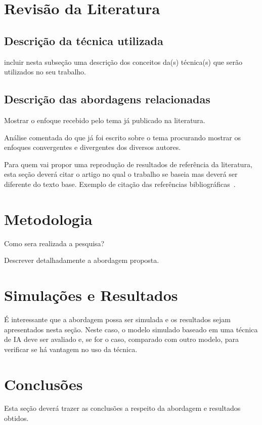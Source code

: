 \documentclass[english]{article}
\begin{document}
\section{Revisão da Literatura}
\subsection{Descrição da técnica utilizada}
incluir nesta subseção uma descrição dos conceitos da(s) técnica(s)
que serão utilizados no seu trabalho.

\subsection{Descrição das abordagens relacionadas}
\vspace{1cm} Mostrar o enfoque recebido pelo tema já publicado na
literatura. \vspace{1cm}

Análise comentada do que já foi escrito sobre o tema procurando
mostrar os enfoques convergentes e divergentes dos diversos
autores. \vspace{1cm}

Para quem vai propor uma reprodução de resultados de referência da literatura, esta
seção deverá citar o artigo no qual o trabalho se baseia mas deverá ser diferente
do texto base.
Exemplo de citação das referências
bibliográficas~\cite{Russell:2003,Pedrycz:2007,haykin2001redes,Braga:2007}.
\vspace{2cm}
\section{Metodologia}
\vspace{1cm} Como sera realizada a pesquisa? \vspace{1cm}

Descrever detalhadamente a abordagem proposta. \vspace{2cm}
\section{Simulações e Resultados}
\vspace{1cm} É interessante que a abordagem possa ser simulada e
os resultados sejam apresentados nesta seção. Neste caso, o modelo
simulado baseado em uma técnica de IA deve ser avaliado e, se for o caso,
comparado com outro modelo, para verificar se há vantagem no uso
da técnica. \vspace{2cm}
\section{Conclusões}
\vspace{1cm} Esta seção deverá trazer as conclusões a respeito da
abordagem e resultados obtidos. \vspace{2cm}



\end{document}
